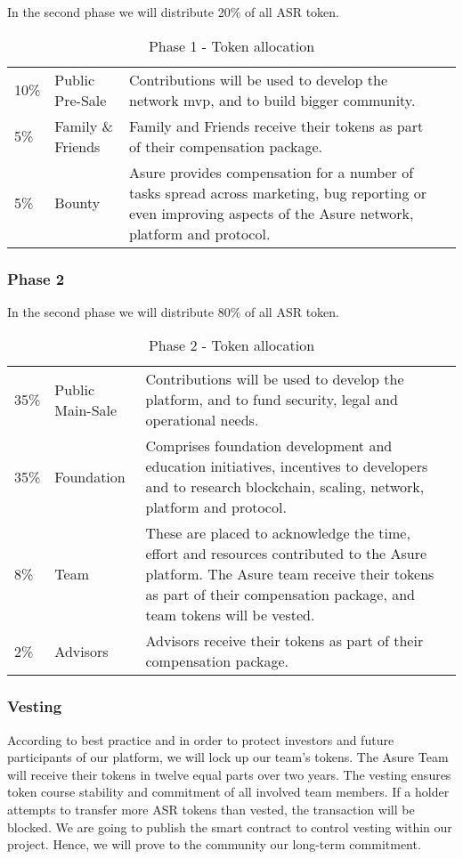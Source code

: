 In the second phase we will distribute 20\% of all ASR token.

\begin{table}[H]
\begin{tabular}{llp{}l}
  10\% & Public Pre-Sale & Contributions will be used to develop the network mvp, and to build bigger community.\\
  5\% & Family \& Friends & Family and Friends receive their tokens as part of their compensation package.\\
  5\% & Bounty & Asure provides compensation for a number of tasks spread across marketing, bug reporting or even improving aspects of the Asure network, platform and protocol.
\end{tabular}
\caption{\label{tab:table-name} Phase 1 - Token allocation}
\end{table}

\subsubsection{Phase 2}

In the second phase we will distribute 80\% of all ASR token.

\begin{table}[H]
\begin{tabular}{llp{}l}
  35\% & Public Main-Sale & Contributions will be used to develop the platform, and to fund security, legal and operational needs. \\
  35\% & Foundation & Comprises foundation development and education initiatives, incentives to developers and to research blockchain, scaling, network, platform and protocol.\\
  8\% & Team  & These are placed to acknowledge the time, effort and resources contributed to the Asure platform.  The Asure team receive their tokens as part of their compensation package, and team tokens will be vested.\\
  2\% & Advisors & Advisors receive their tokens as part of their compensation package.
\end{tabular}
\caption{\label{tab:table-name} Phase 2 - Token allocation}
\end{table}

\subsubsection{Vesting}
According to best practice and in order to protect investors and future participants of our platform, we will lock up our team’s tokens. The Asure Team will receive their tokens in twelve equal parts over two years.
The vesting ensures token course stability and commitment of all involved team members. If a holder attempts to transfer more ASR tokens than vested, the transaction will be blocked.
We are going to publish the smart contract to control vesting within our project. Hence, we will prove to the community our long-term commitment. 

